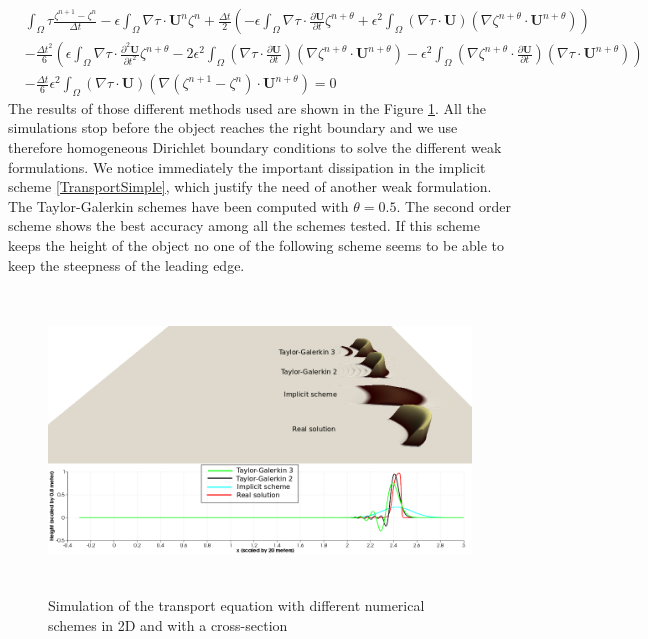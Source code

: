 \documentclass[11pt,a4paper]{article}
\begin{document}
	\begin{align*}
		& \displaystyle \int_{\Omega}{\! \tau \frac{\zeta^{n+1} - \zeta^n}{\Delta t}}  -   \epsilon \int_{\Omega}{\! \nabla \tau \cdot  \mathbf{U}^n  \zeta^n} + \frac{\Delta t}{2}\left( - \epsilon \int_{\Omega}{\! \nabla \tau \cdot \frac{\partial \mathbf{U}}{\partial t} \zeta^{n+\theta}}
		 +  \epsilon^2 \int_{\Omega}{\! (\nabla \tau \cdot \mathbf{U})(\nabla \zeta^{n+\theta} \cdot \mathbf{U}^{n+\theta})}\right) \\
		 & -\frac{\Delta t^2}{6}\left(\epsilon \int_{\Omega}{\! \nabla \tau \cdot \frac{\partial^2 \mathbf{U}}{\partial t^2} \zeta^{n+\theta}} -2\epsilon^2 \int_{\Omega}{\! (\nabla \tau \cdot \frac{\partial \mathbf{U}}{\partial t})(\nabla \zeta^{n+\theta} \cdot \mathbf{U}^{n+\theta})} -\epsilon^2 \int_{\Omega}{\! (\nabla \zeta^{n+\theta} \cdot \frac{\partial \mathbf{U}}{\partial t})(\nabla \tau \cdot \mathbf{U}^{n+\theta})}\right) \\
		 & -\frac{\Delta t}{6} \epsilon^2 \int_{\Omega}{\! (\nabla \tau \cdot \mathbf{U})(\nabla (\zeta^{n+1} -  \zeta^n) \cdot \mathbf{U}^{n+\theta})}  = 0
	\end{align*}	
	The results of those different methods used are shown in the Figure \ref{Transport}. All the simulations stop before the object reaches the right boundary and we use therefore homogeneous Dirichlet boundary conditions to solve the different weak formulations. We notice immediately the important dissipation in the implicit scheme \eqref{TransportSimple}, which justify the need of another weak formulation. The Taylor-Galerkin schemes have been computed with $\theta = 0.5$. The second order scheme shows the best accuracy among all the schemes tested. If this scheme keeps the height of the object no one of the following scheme seems to be able to keep the steepness of the leading edge.
	\begin{figure}
		\includegraphics[height=8cm]{TransportComparison.png}
		\caption{Simulation of the transport equation with different numerical schemes in 2D and with a cross-section}
		\label{Transport}
	\end{figure}
\end{document}
